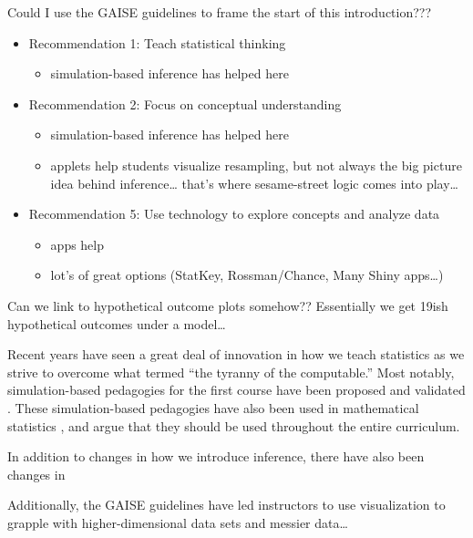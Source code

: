 \documentclass[12pt]{article}
\providecommand{\tightlist}{%
  \setlength{\itemsep}{0pt}\setlength{\parskip}{0pt}}
\begin{document}
Could I use the GAISE guidelines to frame the start of this
introduction???

\begin{itemize}
\tightlist
\item
  Recommendation 1: Teach statistical thinking

  \begin{itemize}
  \tightlist
  \item
    simulation-based inference has helped here
  \end{itemize}
\item
  Recommendation 2: Focus on conceptual understanding

  \begin{itemize}
  \tightlist
  \item
    simulation-based inference has helped here
  \item
    applets help students visualize resampling, but not always the big
    picture idea behind inference\ldots{} that's where sesame-street
    logic comes into play\ldots{}
  \end{itemize}
\item
  Recommendation 5: Use technology to explore concepts and analyze data

  \begin{itemize}
  \tightlist
  \item
    apps help
  \item
    lot's of great options (StatKey, Rossman/Chance, Many Shiny
    apps\ldots{})
  \end{itemize}
\end{itemize}

Can we link to hypothetical outcome plots somehow?? Essentially we get
19ish hypothetical outcomes under a model\ldots{}

Recent years have seen a great deal of innovation in how we teach
statistics as we strive to overcome what \citet{Cobb-2007uo} termed
``the tyranny of the computable.'' Most notably, simulation-based
pedagogies for the first course have been proposed and validated
\citep{Cobb-2007uo, Tintle-2011vo, Tintle-2012td, Maurer-2014te, Tintle2014-vt}.
These simulation-based pedagogies have also been used in mathematical
statistics \citep{chihara2011, Cobb2011-vz}, and \citet{Tintle2015-yv}
argue that they should be used throughout the entire curriculum.

In addition to changes in how we introduce inference, there have also
been changes in

Additionally, the GAISE guidelines have led instructors to use
visualization to grapple with higher-dimensional data sets and messier
data\ldots{}
\end{document}
